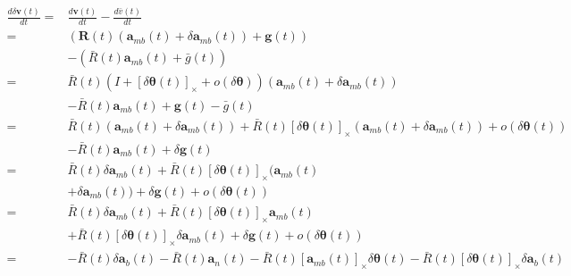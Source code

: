 \documentclass[12pt]{article}
\begin{document}
\begin{equation}
    \begin{aligned}
        \frac{d \delta \pmb{v}(t)}{dt}
        = &
        \frac{d \pmb{v}(t)}{dt} - \frac{ d\bar{v}(t)}{dt}                                                          \\
        = &
        (\pmb{R}(t) (\pmb{a}_{mb}(t)+\delta\pmb{a}_{mb}(t)) + \pmb{g}(t))                                          \\
          &
        - (\bar{R}(t) \pmb{a}_{mb}(t) + \bar{g}(t))                                                                \\
        = &
        \bar{R}(t)(I+[\delta\pmb{\theta}(t)]_\times+o(\delta\pmb{\theta})) (\pmb{a}_{mb}(t)+\delta\pmb{a}_{mb}(t)) \\
          &
        - \bar{R}(t) \pmb{a}_{mb}(t) + \pmb{g}(t) - \bar{g}(t)                                                     \\
        = &
        \bar{R}(t) (\pmb{a}_{mb}(t)+\delta\pmb{a}_{mb}(t))
        + \bar{R}(t)[\delta\pmb{\theta}(t)]_\times (\pmb{a}_{mb}(t)+\delta\pmb{a}_{mb}(t))
        + o(\delta\pmb{\theta}(t))                                                                                 \\
          &
        - \bar{R}(t) \pmb{a}_{mb}(t) + \delta\pmb{g}(t)                                                            \\
        = &
        \bar{R}(t) \delta\pmb{a}_{mb}(t)
        + \bar{R}(t)[\delta\pmb{\theta}(t)]_\times (\pmb{a}_{mb}(t)                                                \\
          &
        +\delta\pmb{a}_{mb}(t))
        + \delta\pmb{g}(t)
        + o(\delta\pmb{\theta}(t))                                                                                 \\
        = &
        \bar{R}(t) \delta\pmb{a}_{mb}(t)
        + \bar{R}(t)[\delta\pmb{\theta}(t)]_\times \pmb{a}_{mb}(t)                                                 \\
          &
        + \bar{R}(t)[\delta\pmb{\theta}(t)]_\times \delta\pmb{a}_{mb}(t)
        + \delta\pmb{g}(t)
        + o(\delta\pmb{\theta}(t))                                                                                 \\
        = &
        - \bar{R}(t) \delta\pmb{a}_{b}(t)
        - \bar{R}(t) \pmb{a}_{n}(t)
        - \bar{R}(t)[\pmb{a}_{mb}(t)]_\times \delta\pmb{\theta}(t)
        - \bar{R}(t)[\delta\pmb{\theta}(t)]_\times \delta\pmb{a}_{b}(t)                                            \\

\end{aligned}
\end{equation}
\end{document}
